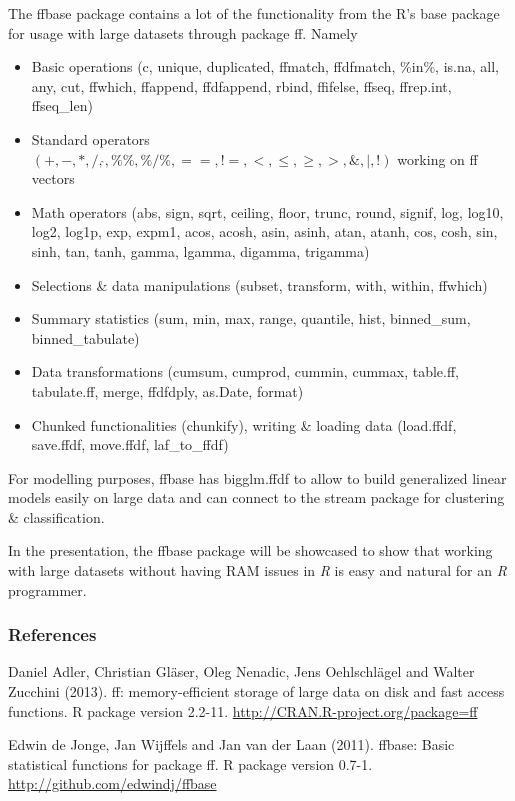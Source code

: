 \documentclass[11pt, a4paper]{article}
\newcommand{\pkg}[1]{{\normalfont\fontseries{b}\selectfont #1}}
\let\proglang=\textit
\begin{document}
The \pkg{ffbase} package contains a lot of the functionality from the R's base package for usage with large datasets through package \pkg{ff}. 
Namely 
\begin{itemize}
  \item Basic operations (c, unique, duplicated, ffmatch, ffdfmatch, \%in\%, is.na, all, any, cut, ffwhich, ffappend, ffdfappend, rbind, ffifelse, ffseq, ffrep.int, ffseq\_len)
  \item Standard operators $(+, -, *, /, \hat{}, \%\%, \%/\%, ==, !=, <, \le, \ge, >, \&, |, !)$ working on ff vectors
  \item Math operators (abs, sign, sqrt, ceiling, floor, trunc, round, signif, log, log10, log2, log1p, exp, expm1, acos, acosh, asin, asinh, atan, atanh, cos, cosh, sin, sinh, tan, tanh, gamma, lgamma, digamma, trigamma)
  \item Selections \& data manipulations (subset, transform, with, within, ffwhich)
  \item Summary statistics (sum, min, max, range, quantile, hist, binned\_sum, binned\_tabulate)
  \item Data transformations (cumsum, cumprod, cummin, cummax, table.ff, tabulate.ff, merge, ffdfdply, as.Date, format)
  \item Chunked functionalities (chunkify), writing \& loading data (load.ffdf, save.ffdf, move.ffdf, laf\_to\_ffdf)
\end{itemize}
For modelling purposes, \pkg{ffbase} has bigglm.ffdf to allow to build generalized linear models easily on large data and can connect to the \pkg{stream} package for clustering \& classification.

In the presentation, the \pkg{ffbase} package will be showcased to show that working with large datasets without having RAM issues in \proglang{R} is easy and natural for an \proglang{R} programmer.



\subsubsection*{References}
Daniel Adler, Christian Gläser, Oleg Nenadic, Jens Oehlschl\"{a}gel and
  Walter Zucchini (2013). ff: memory-efficient storage of large data on
  disk and fast access functions. R package version 2.2-11.
  \url{http://CRAN.R-project.org/package=ff}
  
Edwin de Jonge, Jan Wijffels and Jan van der Laan (2011). ffbase:
  Basic statistical functions for package ff. R package version 0.7-1.
  \url{http://github.com/edwindj/ffbase}
\end{document}
